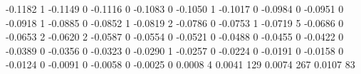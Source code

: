 -0.1182 1
-0.1149 0
-0.1116 0
-0.1083 0
-0.1050 1
-0.1017 0
-0.0984 0
-0.0951 0
-0.0918 1
-0.0885 0
-0.0852 1
-0.0819 2
-0.0786 0
-0.0753 1
-0.0719 5
-0.0686 0
-0.0653 2
-0.0620 2
-0.0587 0
-0.0554 0
-0.0521 0
-0.0488 0
-0.0455 0
-0.0422 0
-0.0389 0
-0.0356 0
-0.0323 0
-0.0290 1
-0.0257 0
-0.0224 0
-0.0191 0
-0.0158 0
-0.0124 0
-0.0091 0
-0.0058 0
-0.0025 0
0.0008 4
0.0041 129
0.0074 267
0.0107 83
